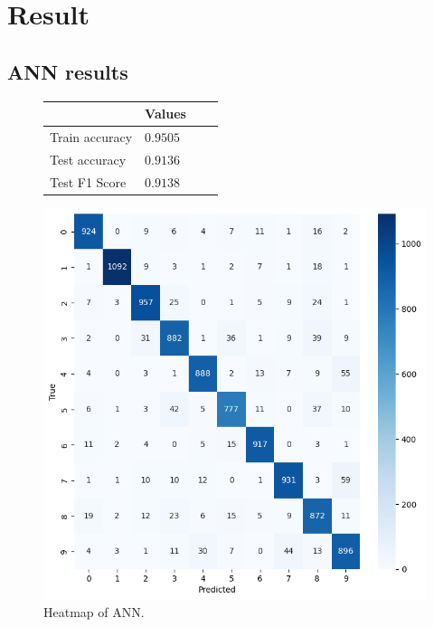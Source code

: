 \section{Result}

\subsection{ANN results}
\begin{figure}[H]
    \centering
    \begin{tabular}{|l|l|l|l|}
        \hline
        \rowcolor{gray!50}
        & Values   \\ \hline
        Train accuracy & $0.9505$ \\ \hline
        Test accuracy & $0.9136$ \\ \hline
        Test F1 Score & $0.9138$ \\ \hline
    \end{tabular}
\end{figure}

\begin{figure}[H]
    \centering
    \includegraphics[scale=0.55]{src/figs/heatmapANN.png}
    \caption{Heatmap of ANN.}
    \label{fig:ANNheatmap}
\end{figure}

